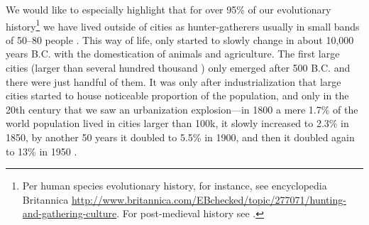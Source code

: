\documentclass[10pt, letterpaper]{article}
\begin{document}
We would like to especially highlight that for over 95\% of our evolutionary history\footnote{%
Per human species evolutionary history, for instance, see encyclopedia Britannica
   \url{http://www.britannica.com/EBchecked/topic/277071/hunting-and-gathering-culture}. 
   For post-medieval history see \citet{white77}.%
 } we have lived outside of cities as hunter-gatherers usually in small bands of 50--80 people \citep{maryanski92}.
 This way of life, only started to slowly change in about 10,000 years B.C.  with the domestication of animals
 and agriculture. The first large cities (larger than several hundred thousand%
 ) only emerged after 500 B.C. and there were just handful of them. 
 It was only after industrialization that large cities started to house noticeable proportion of the population, and only in the 20th century that we saw an urbanization explosion---in 1800 a mere 1.7\% of the world population lived in cities larger than 100k, it slowly increased to 2.3\% in 1850, by another 50 years it doubled to 5.5\% in 1900,
 and then it doubled again to 13\% in 1950 \citep{davis55}.
\end{document}
